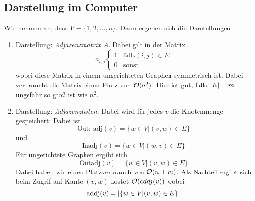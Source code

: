             \subsection{Darstellung im Computer}
                Wir nehmen an, dass $V=\{1,2,...,n\}$. Dann ergeben sich die Darstellungen
                \begin{enumerate}
                    \item Darstellung: \emph{Adjazenzmatrix A}. Dabei gilt in der Matrix
                        $$
                            a_{i,j} \begin{cases}
                                        1 & \text{falls} (i,j) \in E \\
                                        0 & \text{sonst}
                                    \end{cases}
                        $$
                        wobei diese Matrix in einem ungerichteten Graphen symmetrisch ist. Dabei verbraucht die Matrix einen Platz von $\mathcal{O}(n^2)$. Dies ist gut, falls $\lvert E\rvert = m$ ungefähr so groß ist wie $n^2$.
                    \item Darstellung: \emph{Adjazenzlisten}. Dabei wird für jedes $v$ die Knotenmenge gespeichert: Dabei ist
                        $$
                            \text{Out: adj}(v) = \{ w \in V | (v,w) \in E \}
                        $$
                        und
                        $$
                            \text{Inadj}(v) = \{ w \in V | (w,v) \in E \}
                        $$
                        Für ungerichtete Graphen ergibt sich
                        $$
                            \text{Outadj}(v) = \{ w \in V | (v,w) \in E \}
                        $$     
                        Dabei haben wir einen Platzverbrauch von $\mathcal{O}(n+m)$. Als Nachteil ergibt sich beim Zugrif auf Kante $(v,w)$ kostet $\mathcal{O}(addj(v))$ wobei
                        $$
                            \text{addj}(v) = \lvert\{w \in V | (v,w) \in E \}\rvert
                        $$        
                \end{enumerate}
                
